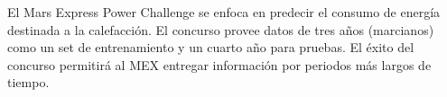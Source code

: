 \documentclass[../Main.tex]{subfiles}
\begin{document}
El Mars Express Power Challenge se enfoca en predecir el consumo de energía destinada a la calefacción. El concurso provee datos de tres años (marcianos) como un set de entrenamiento y un cuarto año para pruebas. El éxito del concurso permitirá al MEX entregar información por periodos más largos de tiempo.






\end{document}
